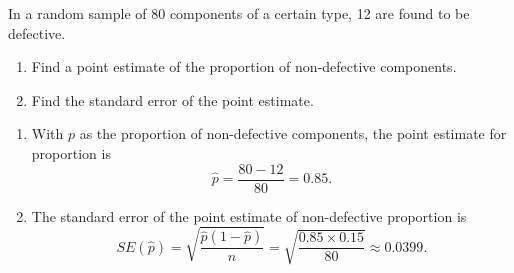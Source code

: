 \begin{example}
     In a random sample of 80 components of a certain
 type, 12 are found to be defective.
 \begin{enumerate}
    \item Find a point estimate of the proportion of non-defective components.
    \item Find the standard error of the point estimate.
 \end{enumerate}
\end{example}
\begin{solution}
    \begin{enumerate}
        \item With $p$ as the proportion of non-defective components,
        the point estimate for proportion is
        \[
            \hat{p} = \frac{80-12}{80} = 0.85.
        \]
        
        \item The standard error of the point estimate of non-defective proportion is
        \[
            SE(\hat{p}) = \sqrt{\frac{\hat{p}(1-\hat{p})}{n}} = \sqrt{\frac{0.85 \times 0.15}{80}} \approx 0.0399.
        \]
    \end{enumerate}
\end{solution}

